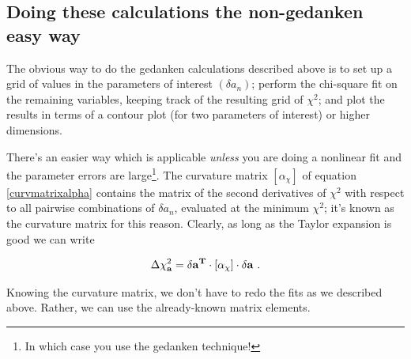 \documentclass[psfig,preprint]{aastex}
\begin{document}
\subsection{ Doing these calculations the non-gedanken easy way}
\label{easycalc}

	The obvious way to do the gedanken calculations described above
is to set up a grid of values in the parameters of interest $(\delta
a_n)$; perform the chi-square fit on the remaining variables, keeping
track of the resulting grid of $\chi^2$; and plot the results in terms
of a contour plot (for two parameters of interest) or higher dimensions.

	There's an easier way which is applicable {\it unless} you are
doing a nonlinear fit and the parameter errors are large\footnote{In
which case you use the gedanken technique!}.  The curvature matrix
$[\alpha_\chi]$ of equation \ref{curvmatrixalpha} contains the matrix of the
second derivatives of $\chi^2$ with respect to all pairwise combinations
of $\delta a_n$, evaluated at the minimum $\chi^2$; it's known as the
curvature matrix for this reason.  Clearly, as long as the Taylor
expansion is good we can write

\begin{equation}
\Delta \chi_{\bf a}^2 = {\bf \delta a^T \cdot [\alpha_\chi] \cdot \delta a} \ .
\end{equation}

\noindent Knowing the curvature matrix, we don't have to redo the fits
as we described above.  Rather, we can use the already-known matrix
elements. 
\end{document}
